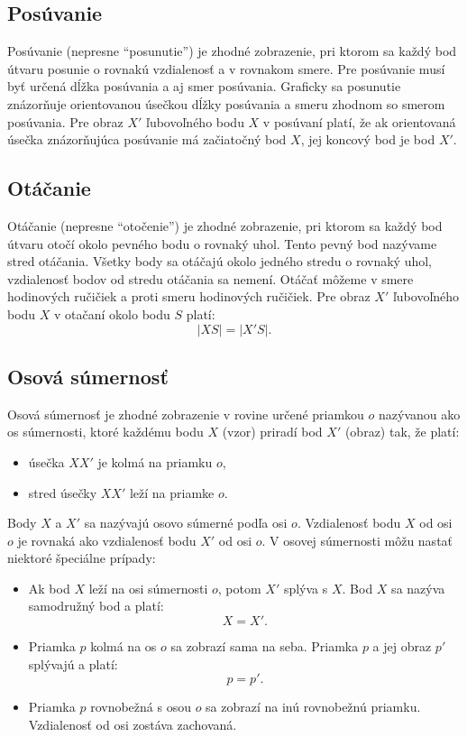 \documentclass{report}
\begin{document}
\subsection{Posúvanie}

Posúvanie (nepresne \enquote{posunutie}) je zhodné zobrazenie, pri ktorom sa každý bod útvaru posunie o rovnakú vzdialenosť a v rovnakom smere. Pre posúvanie musí byť určená dĺžka posúvania a aj smer posúvania. Graficky sa posunutie znázorňuje orientovanou úsečkou dĺžky posúvania a smeru zhodnom so smerom posúvania. Pre obraz \(X'\) ľubovoľného bodu \(X\) v posúvaní platí, že ak orientovaná úsečka znázorňujúca posúvanie má začiatočný bod \(X\), jej koncový bod je bod \(X'\).

\subsection{Otáčanie}

Otáčanie (nepresne \enquote{otočenie}) je zhodné zobrazenie, pri ktorom sa každý bod útvaru otočí okolo pevného bodu o rovnaký uhol. Tento pevný bod nazývame stred otáčania. Všetky body sa otáčajú okolo jedného stredu o rovnaký uhol, vzdialenosť bodov od stredu otáčania sa nemení. Otáčať môžeme v smere hodinových ručičiek a proti smeru hodinových ručičiek. Pre obraz \(X'\) ľubovoľného bodu \(X\) v otačaní okolo bodu \(S\) platí:
\[
|XS| = |X'S|.
\]

\subsection{Osová súmernosť}

Osová súmernosť je zhodné zobrazenie v rovine určené priamkou \(o\) nazývanou ako os súmernosti, ktoré každému bodu \(X\) (vzor) priradí bod \(X'\) (obraz) tak, že platí:
\begin{itemize}
  \item úsečka \(XX'\) je kolmá na priamku \(o\),
  \item stred úsečky \(XX'\) leží na priamke \(o\).
\end{itemize}

Body \(X\) a \(X'\) sa nazývajú osovo súmerné podľa osi \(o\). Vzdialenosť bodu \(X\) od osi \(o\) je rovnaká ako vzdialenosť bodu \(X'\) od osi \(o\). V osovej súmernosti môžu nastať niektoré špeciálne prípady:
\begin{itemize}
  \item Ak bod \(X\) leží na osi súmernosti \(o\), potom \(X'\) splýva s \(X\). Bod \(X\) sa nazýva samodružný bod a platí:
  \[
  X = X'.
  \]
  \item Priamka \(p\) kolmá na os \(o\) sa zobrazí sama na seba. Priamka \(p\) a jej obraz \(p'\) splývajú a platí:
  \[
  p = p'.
  \]
  \item Priamka \(p\) rovnobežná s osou \(o\) sa zobrazí na inú rovnobežnú priamku. Vzdialenosť od osi zostáva zachovaná.
\end{itemize}
\end{document}
